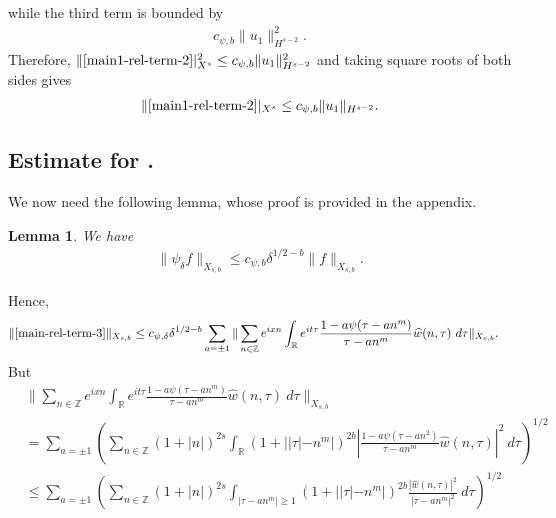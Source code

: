 \documentclass[12pt,reqno]{amsart}
\numberwithin{equation}{section}  %
\renewcommand{\cref}{\Cref}
\newcommand{\rr}{\mathbb{R}}
\newcommand{\zz}{\mathbb{Z}}
\newcommand{\wh}{\widehat}
\newtheorem{lemma}[theorem]{Lemma}
\begin{document}
while the third term is bounded by  
%
%
\begin{equation*}
\begin{split}
  c_{\psi,b}  \| u_{1} \|_{H^{s-2}}^{2}.
\end{split}
\end{equation*}
%
%
Therefore, 
$\|\cref{main1-rel-term-2}|_{X^{s}}^{2} \le c_{\psi,b} 
\|u_{1}\|_{H^{s-2}}^2$ and
taking square roots of both sides gives
%
%
\begin{equation*}
  \begin{split}
    \|\cref{main1-rel-term-2}|_{X^{s}} \le c_{\psi,b} 
    \|u_{1}\|_{H^{s-2}}.
  \end{split}
\end{equation*}
%
%
%
%
\subsection{Estimate for \cref{main1-rel-term-3}.}
We now need the following lemma, whose proof is provided in the appendix.
%
%
%
%
%
%
%
%
\begin{lemma}
\label{lem:schwartz-mult}
We have
%
%
\begin{equation}
	\label{schwartz-mult}
	\begin{split}
    \|\psi_{\delta} f \|_{X_{s,b}} \le c_{\psi, b} \delta^{1/2-b} \|f \|_{X_{s,b}}.
	\end{split}
\end{equation}
%
%
\end{lemma}
%
%
Hence,
%
%
\begin{equation}
  \label{yu}
	\begin{split}
		\|\cref{main-rel-term-3}\|_{X_{s,b}} 
    & \le c_{\psi, \delta} \delta^{1/2-b}
    \sum_{a = \pm 1} \| \sum_{n \in \zz} e^{ixn} \int_\rr 
		e^{it \tau} \frac{ 1 - a\psi (\tau - an^{m} ) 
		}{\tau - an^{m}} \wh{w}(n, \tau) \ 
		d \tau\|_{X_{s,b}}.
			\end{split}
\end{equation}
%
But
%
%
\begin{equation}
\label{main-int2-est-X-s-part}
\begin{split}
  & \| \sum_{n \in \zz} e^{ixn} \int_\rr 
		e^{it \tau} \frac{ 1 - a\psi (\tau - an^{m} ) 
		}{\tau - an^{m}} \wh{w}(n, \tau) \ 
		d \tau\|_{X_{s,b}}
		\\
    & = \sum_{a = \pm 1}\left( \sum_{n \in \zz} \left (1 + |n| \right )^{2s} \int_\rr
    (1 + |  |\tau| - n^{m}|)^{2b} \left | \frac{1 - a\psi(\tau - an^{2 
		})}{\tau - an^{m}} 
		\wh{w}(n, \tau) \right |^2 \ d 
		\tau \right)^{1/2}
		\\
    & \le \sum_{a = \pm 1}
    \left( \sum_{n \in \zz} \left (1 + |n| \right )^{2s} \int_{| \tau - an^{m }| \ge 1}
    (1 + | |\tau| - n^{m}|)^{2b} \frac{|\wh{w}(n, \tau)|^2 }{|\tau - an^{m }|^2} 
		\ d 
		\tau \right)^{1/2}
  \end{split}
\end{equation}
\end{document}
